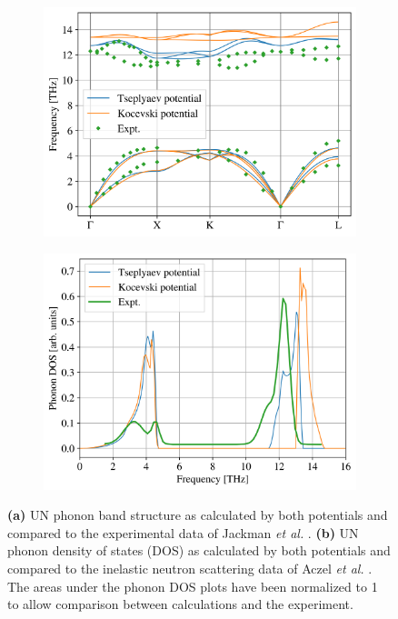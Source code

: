 \documentclass[preprint, 12pt]{elsarticle}
\begin{document}
\begin{figure}[h!]
\centering
\begin{subfigure}{0.45\textwidth}
    \includegraphics[width=\textwidth]{PBS.png}
    \caption{}
    \label{Fig:PBS}
\end{subfigure}
\hfill
\begin{subfigure}{0.45\textwidth}
    \includegraphics[width=\textwidth]{PDOS.png}
    \caption{}
    \label{Fig:PDOS}
\end{subfigure}
\caption{\textbf{(a)} UN phonon band structure as calculated by both potentials and compared to the experimental data of Jackman \textit{et al.} \cite{Jackman1986}. \textbf{(b)} UN phonon density of states (DOS) as calculated by both potentials and compared to the inelastic neutron scattering data of Aczel \textit{et al.} \cite{Aczel2012}. The areas under the phonon DOS plots have been normalized to 1 to allow comparison between calculations and the experiment.}
\label{Fig:Phonons}
\end{figure}
\end{document}
